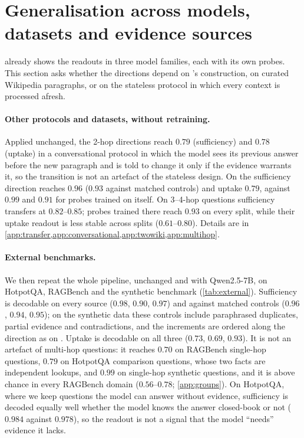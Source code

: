 \section{Generalisation across models, datasets and evidence sources}
\label{sec:external}

 already shows the readouts in three model families, each with its own probes. This section asks whether the directions depend on \musique{}'s construction, on curated Wikipedia paragraphs, or on the stateless protocol in which every context is processed afresh.

\paragraph{Other protocols and datasets, without retraining.}
Applied unchanged, the 2-hop \musique{} directions reach $0.79$ (sufficiency) and $0.78$ (uptake) in a conversational protocol in which the model sees its previous answer before the new paragraph and is told to change it only if the evidence warrants it, so the transition is not an artefact of the stateless design. On \twowiki{} the sufficiency direction reaches $0.96$ ($0.93$ against matched controls) and uptake $0.79$, against $0.99$ and $0.91$ for probes trained on \twowiki{} itself. On 3--4-hop \musique{} questions sufficiency transfers at $0.82$--$0.85$; probes trained there reach $0.93$ on every split, while their uptake readout is less stable across splits ($0.61$--$0.80$). Details are in \cref{app:transfer,app:conversational,app:twowiki,app:multihop}.

\paragraph{External benchmarks.}
We then repeat the whole pipeline, unchanged and with Qwen2.5-7B, on HotpotQA, RAGBench and the synthetic benchmark (\cref{tab:external}). Sufficiency is decodable on every source ($0.98$, $0.90$, $0.97$) and against matched controls ($0.96$, $0.94$, $0.95$); on the synthetic data these controls include paraphrased duplicates, partial evidence and contradictions, and the increments are ordered along the direction as on \musique{}. Uptake is decodable on all three ($0.73$, $0.69$, $0.93$). It is not an artefact of multi-hop questions: it reaches $0.70$ on RAGBench single-hop questions, $0.79$ on HotpotQA comparison questions, whose two facts are independent lookups, and $0.99$ on single-hop synthetic questions, and it is above chance in every RAGBench domain ($0.56$--$0.78$; \cref{app:groups}). On HotpotQA, where we keep questions the model can answer without evidence, sufficiency is decoded equally well whether the model knows the answer closed-book or not ($0.984$ against $0.978$), so the readout is not a signal that the model ``needs'' evidence it lacks.

